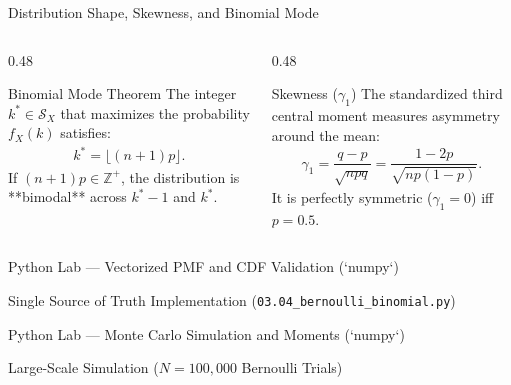 \documentclass[aspectratio=169,xcolor={dvipsnames,table}]{beamer}
\begin{document}
\begin{frame}{Distribution Shape, Skewness, and Binomial Mode}
	\begin{columns}[T]
		\begin{column}{0.48\textwidth}
			\begin{block}{Binomial Mode Theorem}
				\small
				The integer $k^* \in \mathcal{S}_X$ that maximizes the probability $f_X(k)$ satisfies:
				\begin{align*}
					k^* = \lfloor (n+1)p \rfloor.
				\end{align*}
				If $(n+1)p \in \mathbb{Z}^+$, the distribution is **bimodal** across $k^* - 1$ and $k^*$.
			\end{block}
		\end{column}
		\begin{column}{0.48\textwidth}
			\begin{alertblock}{Skewness ($\gamma_1$)}
				\small
				The standardized third central moment measures asymmetry around the mean:
				\begin{align*}
					\gamma_1 = \dfrac{q - p}{\sqrt{npq}} = \dfrac{1 - 2p}{\sqrt{np(1-p)}}.
				\end{align*}
				It is perfectly symmetric ($\gamma_1=0$) iff $p=0.5$.
			\end{alertblock}
		\end{column}
	\end{columns}
\end{frame}

\begin{frame}[fragile]{Python Lab --- Vectorized PMF and CDF Validation (`numpy`)}
	\vspace{-0.15cm}
	\begin{block}{Single Source of Truth Implementation (\texttt{03.04\_bernoulli\_binomial.py})}
		
	\end{block}
\end{frame}

\begin{frame}[fragile]{Python Lab --- Monte Carlo Simulation and Moments (`numpy`)}
	\begin{block}{Large-Scale Simulation ($N=100,000$ Bernoulli Trials)}
		
	\end{block}
\end{frame}
\end{document}
